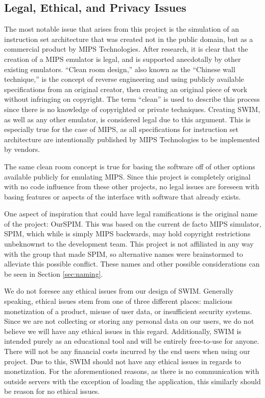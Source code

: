 \documentclass[
    paper=letter,
    parskip=half,
    fontsize=12pt,
    titlepage=firstiscover,
    toc=bibliography,
    numbers=endperiod
]{scrartcl}
\begin{document}
\subsection{Legal, Ethical, and Privacy Issues}
The most notable issue that arises from this project is the simulation
of an instruction set architecture that was created not in the public
domain, but as a commercial product by MIPS Technologies. After
research, it is clear that the creation of a MIPS emulator is legal, and
is supported anecdotally by other existing emulators. “Clean room
design,” also known as the “Chinese wall technique,” is the concept of
reverse engineering and using publicly available specifications from an
original creator, then creating an original piece of work without
infringing on copyright. The term “clean” is used to describe this
process since there is no knowledge of copyrighted or private
techniques. Creating SWIM, as well as any other emulator, is considered
legal due to this argument. This is especially true for the case of
MIPS, as all specifications for instruction set architecture are
intentionally published by MIPS Technologies to be implemented by
vendors.

The same clean room concept is true for basing the software off of other
options available publicly for emulating MIPS. Since this project is
completely original with no code influence from these other projects, no
legal issues are foreseen with basing features or aspects of the
interface with software that already exists.

One aspect of inspiration that could have legal ramifications is the
original name of the project: OurSPIM. This was based on the current de
facto MIPS simulator, SPIM, which while is simply MIPS backwards, may
hold copyright restrictions unbeknownst to the development team. This
project is not affiliated in any way with the group that made SPIM, so
alternative names were brainstormed to alleviate this possible conflict.
These names and other possible considerations can be seen in Section
\ref{sec:naming}.

We do not foresee any ethical issues from our design of SWIM. Generally
speaking, ethical issues stem from one of three different places:
malicious monetization of a product, misuse of user data, or
insufficient security systems. Since we are not collecting or storing
any personal data on our users, we do not believe we will have any
ethical issues in this regard. Additionally, SWIM is intended purely as
an educational tool and will be entirely free-to-use for anyone. There
will not be any financial costs incurred by the end users when using our
project. Due to this, SWIM should not have any ethical issues in regards
to monetization. For the aforementioned reasons, as there is no
communication with outside servers with the exception of loading the
application, this similarly should be reason for no ethical issues.
\end{document}
